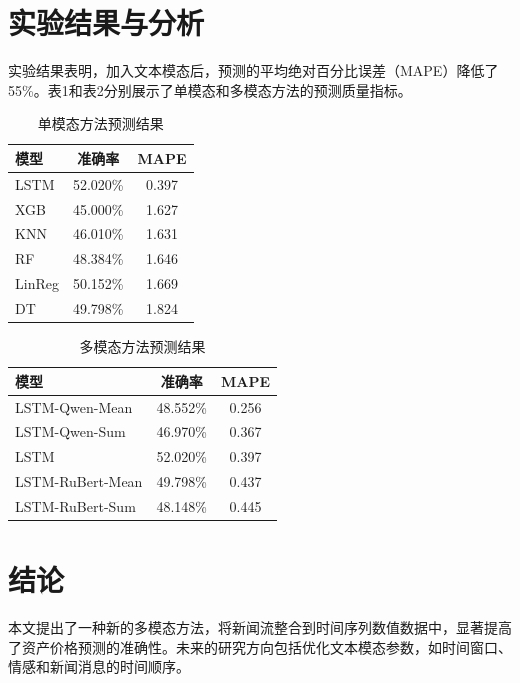 \documentclass[10pt,twocolumn]{article}
\begin{document}
\section{实验结果与分析}
实验结果表明，加入文本模态后，预测的平均绝对百分比误差（MAPE）降低了55\%。表1和表2分别展示了单模态和多模态方法的预测质量指标。

\begin{table}[h]
\centering
\caption{单模态方法预测结果}
\begin{tabular}{lcc}
\hline
模型 & 准确率 & MAPE \\
\hline
LSTM & 52.020\% & 0.397 \\
XGB & 45.000\% & 1.627 \\
KNN & 46.010\% & 1.631 \\
RF & 48.384\% & 1.646 \\
LinReg & 50.152\% & 1.669 \\
DT & 49.798\% & 1.824 \\
\hline
\end{tabular}
\end{table}

\begin{table}[h]
\centering
\caption{多模态方法预测结果}
\begin{tabular}{lcc}
\hline
模型 & 准确率 & MAPE \\
\hline
LSTM-Qwen-Mean & 48.552\% & 0.256 \\
LSTM-Qwen-Sum & 46.970\% & 0.367 \\
LSTM & 52.020\% & 0.397 \\
LSTM-RuBert-Mean & 49.798\% & 0.437 \\
LSTM-RuBert-Sum & 48.148\% & 0.445 \\
\hline
\end{tabular}
\end{table}

\section{结论}
本文提出了一种新的多模态方法，将新闻流整合到时间序列数值数据中，显著提高了资产价格预测的准确性。未来的研究方向包括优化文本模态参数，如时间窗口、情感和新闻消息的时间顺序。
\end{document}
